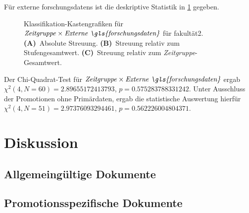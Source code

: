 Für externe \glspl{forschungsdaten} ist die deskriptive Statistik in \cref{fig:faculty_i_sampled_evaluated_adjusted_factors-only_Zeitgruppe_x_Externe.FD_absolute_boxplot} gegeben.
\begin{figure}[!htbp]
    \centering%
    \resizebox{.33\textwidth}{!}{}%
    \resizebox{.33\textwidth}{!}{}%
    \resizebox{.33\textwidth}{!}{}%
    \caption{Klassifikation-Kastengrafiken für $\text{\textit{Zeitgruppe}}\times\text{\textit{Externe \gls{forschungsdaten}}}$ für \gls{fakultät2}. \textbf{(A)}~Absolute Streuung. \textbf{(B)}~Streuung relativ zum Stufengesamtwert. \textbf{(C)}~Streuung relativ zum \textit{Zeitgruppe}-Gesamtwert.}
    \label{fig:faculty_i_sampled_evaluated_adjusted_factors-only_Zeitgruppe_x_Externe.FD_absolute_boxplot}
\end{figure} 
Der Chi-Quadrat-Test für $\text{\textit{Zeitgruppe}}\times\text{\textit{Externe \gls{forschungsdaten}}}$ ergab $\chi^2 (\num{4}, N = \num{60}) = \num[round-mode=places,round-precision=3]{2.89655172413793}$, $p = \num[round-mode=places,round-precision=3]{0.575283788331242}$.
Unter Ausschluss der Promotionen ohne Primärdaten, ergab die statistische Auswertung hierfür $\chi^2 (\num{4}, N = \num{51}) = \num[round-mode=places,round-precision=3]{2.97376093294461}$, $p = \num[round-mode=places,round-precision=3]{0.562226004804371}$.

\section{Diskussion}\label{sec:luh-repo-discussion}
\subsection{Allgemeingültige Dokumente}\label{sec:luh-repo-discussion-general}
\subsection{Promotionsspezifische Dokumente}\label{sec:luh-repo-discussion-specific}

